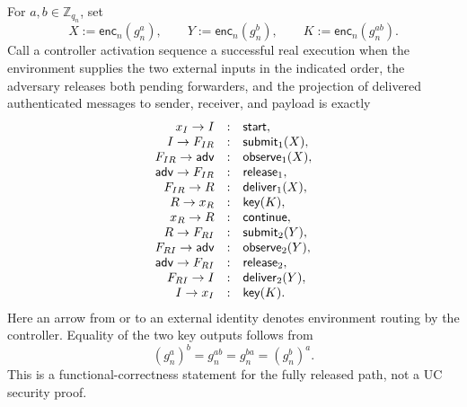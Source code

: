 \begin{definition}
\label{def:dhke-real-path}
\notready
For \(a,b\in\mathbb Z_{q_n}\), set
\[
  X:=\mathsf{enc}_n(g_n^a),
  \qquad
  Y:=\mathsf{enc}_n(g_n^b),
  \qquad
  K:=\mathsf{enc}_n(g_n^{ab}).
\]
Call a controller activation sequence a successful real execution when the
environment supplies the two external inputs in the indicated order, the
adversary releases both pending forwarders, and the projection of delivered
authenticated messages to sender, receiver, and payload is exactly
\[
\begin{array}{rcl}
  x_I\to I &:& \mathsf{start},\\
  I\to F_{IR} &:& \mathsf{submit}_1(X),\\
  F_{IR}\to\mathsf{adv} &:& \mathsf{observe}_1(X),\\
  \mathsf{adv}\to F_{IR} &:& \mathsf{release}_1,\\
  F_{IR}\to R &:& \mathsf{deliver}_1(X),\\
  R\to x_R &:& \mathsf{key}(K),\\
  x_R\to R &:& \mathsf{continue},\\
  R\to F_{RI} &:& \mathsf{submit}_2(Y),\\
  F_{RI}\to\mathsf{adv} &:& \mathsf{observe}_2(Y),\\
  \mathsf{adv}\to F_{RI} &:& \mathsf{release}_2,\\
  F_{RI}\to I &:& \mathsf{deliver}_2(Y),\\
  I\to x_I &:& \mathsf{key}(K).
\end{array}
\]
Here an arrow from or to an external identity denotes environment routing by
the controller.  Equality of the two key outputs follows from
\[
  (g_n^a)^b=g_n^{ab}=g_n^{ba}=(g_n^b)^a.
\]
This is a functional-correctness statement for the fully released path, not a
UC security proof.
\end{definition}


